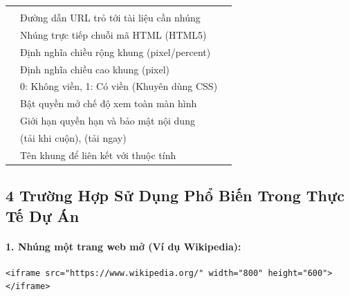 \begin{prettyTableBox}
\begin{tabularx}{\linewidth}{K{2.4cm} Z Z}
 &  &  \\
 & Đường dẫn URL trỏ tới tài liệu cần nhúng &  \\
 & Nhúng trực tiếp chuỗi mã HTML (HTML5) &  \\
 & Định nghĩa chiều rộng khung (pixel/percent) &  \\
 & Định nghĩa chiều cao khung (pixel) &  \\
 & 0: Không viền, 1: Có viền (Khuyên dùng CSS) &  \\
 & Bật quyền mở chế độ xem toàn màn hình &  \\
 & Giới hạn quyền hạn và bảo mật nội dung &  \\
 &  (tải khi cuộn),  (tải ngay) &  \\
 & Tên khung để liên kết với thuộc tính  &  \\
\end{tabularx}
\end{prettyTableBox}

\subsection{4 Trường Hợp Sử Dụng  Phổ Biến Trong Thực Tế Dự Án}

\paragraph{1. Nhúng một trang web mở (Ví dụ Wikipedia):}
\begin{codeWindow}
\begin{lstlisting}[language=HTML5]
<iframe src="https://www.wikipedia.org/" width="800" height="600"></iframe>
\end{lstlisting}
\end{codeWindow}

